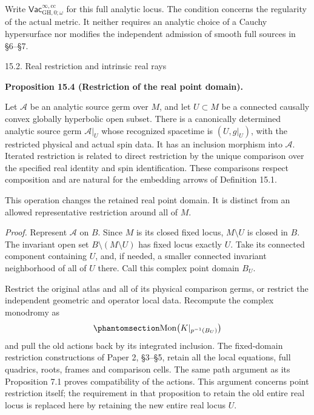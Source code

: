 \documentclass[
  english,
  11pt,
  reqno]{amsart}
\makeatletter
\newcommand{\paperstatementsection}{\@startsection{subsection}{2}%
  \z@{.5\linespacing\@plus.7\linespacing}{.35\baselineskip}%
  {\normalfont\bfseries}}
\newcommand{\paperfirststatement}[1]{%
  {\normalfont\bfseries #1\par}%
  \nobreak\@afterindenttrue\@afterheading}
\makeatother
\begin{document}
Write \(\mathsf{Vac}^{\infty,\mathrm{cc}}_{\mathrm{GH},0;\omega}\) for
this full analytic locus. The condition concerns the regularity of the
actual metric. It neither requires an analytic choice of a Cauchy
hypersurface nor modifies the independent admission of smooth full
sources in §6--§7.

\protect{}\label{sec:analytic-source-real-restriction}
\paperstatementsection{15.2. Real restriction and intrinsic real
rays}\label{real-restriction-and-intrinsic-real-rays}
\paperfirststatement{\protect{}\label{prop:analytic-source-real-point-restriction}Proposition 15.4 (Restriction of the real point domain).}

Let \(\mathcal A\) be an analytic source germ over \(M\), and let
\(U\subset M\) be a connected causally convex globally hyperbolic open
subset. There is a canonically determined analytic source germ
\(\mathcal A|_U\) whose recognized spacetime is \((U,g|_U)\), with the
restricted physical and actual spin data. It has an inclusion morphism
into \(\mathcal A\). Iterated restriction is related to direct
restriction by the unique comparison over the specified real identity
and spin identification. These comparisons respect composition and are
natural for the embedding arrows of Definition 15.1.

This operation changes the retained real point domain. It is distinct
from an allowed representative restriction around all of \(M\).

\emph{Proof.} Represent \(\mathcal A\) on \(B\). Since \(M\) is its
closed fixed locus, \(M\setminus U\) is closed in \(B\). The invariant
open set \(B\setminus(M\setminus U)\) has fixed locus exactly \(U\).
Take its connected component containing \(U\), and, if needed, a smaller
connected invariant neighborhood of all of \(U\) there. Call this
complex point domain \(B_U\).

Restrict the original atlas and all of its physical comparison germs, or
restrict the independent geometric and operator local data. Recompute
the complex monodromy as
\begin{equation}\protect\phantomsection\label{eq:analytic-source-real-domain-monodromy}{
\operatorname{Mon}\bigl(K|_{p^{-1}(B_U)}\bigr)
}\end{equation} and pull the old actions back by its integrated
inclusion. The fixed-domain restriction constructions of Paper 2,
§3--§5, retain all the local equations, full quadrics, roots, frames and
comparison cells. The same path argument as its Proposition 7.1 proves
compatibility of the actions. This argument concerns point restriction
itself; the requirement in that proposition to retain the old entire
real locus is replaced here by retaining the new entire real locus
\(U\).
\end{document}
